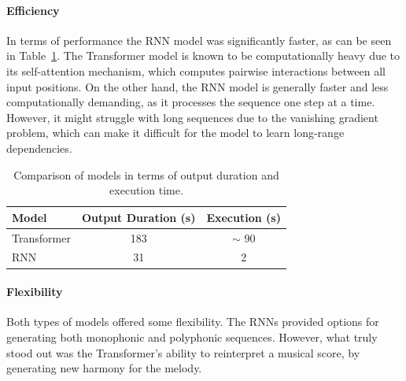 \documentclass[twocolumn]{article}
\begin{document}
\paragraph{Efficiency}
In terms of performance the RNN model was significantly faster, as can be seen in Table~\ref{table:comparison}. The Transformer model is known to be computationally heavy due to its self-attention mechanism, which computes pairwise interactions between all input positions. On the other hand, the RNN model is generally faster and less computationally demanding, as it processes the sequence one step at a time. However, it might struggle with long sequences due to the vanishing gradient problem, which can make it difficult for the model to learn long-range dependencies.
\begin{table}[h]
  \centering
  \begin{tabular}{|l|c|c|}
  \hline
  \textbf{Model} & \textbf{Output Duration (s)} & \textbf{Execution (s)} \\
  \hline
  Transformer & 183 & $\sim$ 90 \\
  \hline
  RNN & 31 & 2 \\
  \hline
  \end{tabular}
  \caption{Comparison of models in terms of output duration and execution time.}
  \label{table:comparison}
\end{table}
\paragraph{Flexibility} Both types of models offered some flexibility. The RNNs provided options for generating both monophonic and polyphonic sequences. However, what truly stood out was the Transformer's ability to reinterpret a musical score, by generating new harmony for the melody.

\newpage


\end{document}
